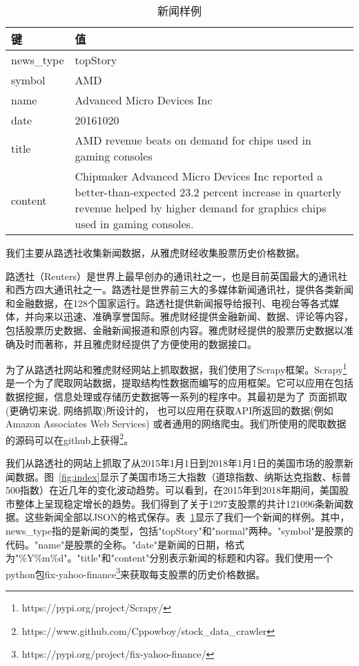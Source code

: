 \begin{table}[ht]
    \centering
    \begin{minipage}[t]{0.8\linewidth}
    	\caption[]{新闻样例}
    	\label{tab:newsexample}
    	\begin{tabularx}{1\linewidth}{lX}
    		\toprule
    		键 & 值 \\ \midrule
    		news\_type & topStory \\ 
    		symbol & AMD \\ 
    		name & Advanced Micro Devices Inc \\ 
    		date & 20161020 \\ 
    		title & AMD revenue beats on demand for chips used in gaming consoles \\ 
    		content & Chipmaker Advanced Micro Devices Inc reported a better-than-expected 23.2 percent increase in quarterly revenue helped by higher demand for graphics chips used in gaming consoles. \\ 
    		\bottomrule
    	\end{tabularx}
    \end{minipage}
\end{table}

我们主要从路透社收集新闻数据，从雅虎财经收集股票历史价格数据。

路透社（Reuters）是世界上最早创办的通讯社之一，也是目前英国最大的通讯社和西方四大通讯社之一。路透社是世界前三大的多媒体新闻通讯社，提供各类新闻和金融数据，在128个国家运行。路透社提供新闻报导给报刊、电视台等各式媒体，并向来以迅速、准确享誉国际。雅虎财经提供金融新闻、数据、评论等内容，包括股票历史数据、金融新闻报道和原创内容。雅虎财经提供的股票历史数据以准确及时而著称，并且雅虎财经提供了方便使用的数据接口。

为了从路透社网站和雅虎财经网站上抓取数据，我们使用了Scrapy框架。Scrapy\footnote{https://pypi.org/project/Scrapy/}是一个为了爬取网站数据，提取结构性数据而编写的应用框架。它可以应用在包括数据挖掘，信息处理或存储历史数据等一系列的程序中。其最初是为了 页面抓取 (更确切来说, 网络抓取)所设计的， 也可以应用在获取API所返回的数据(例如 Amazon Associates Web Services) 或者通用的网络爬虫。我们所使用的爬取数据的源码可以在github上获得\footnote{https://www.github.com/Cppowboy/stock\_data\_crawler}。

我们从路透社的网站上抓取了从2015年1月1日到2018年1月1日的美国市场的股票新闻数据。图~\ref{fig:index}显示了美国市场三大指数（道琼指数、纳斯达克指数、标普500指数）在近几年的变化波动趋势。可以看到，在2015年到2018年期间，美国股市整体上呈现稳定增长的趋势。我们得到了关于1297支股票的共计121096条新闻数据。这些新闻全部以JSON的格式保存。表~\ref{tab:newsexample}显示了我们一个新闻的样例。其中，news\_type指的是新闻的类型，包括"topStory"和"normal"两种。"symbol"是股票的代码。"name"是股票的全称。"date"是新闻的日期，格式为"\%Y\%m\%d"。"title"和"content"分别表示新闻的标题和内容。我们使用一个python包fix-yahoo-finance\footnote{https://pypi.org/project/fix-yahoo-finance/}来获取每支股票的历史价格数据。

